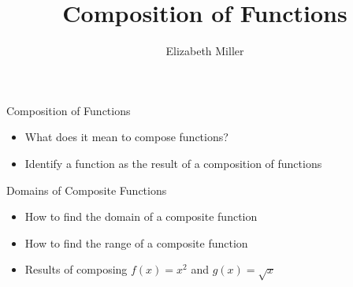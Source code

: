 \documentclass{ximera}
\author{Elizabeth Miller}
\title{Composition of Functions}
\begin{document}
\begin{abstract}
\end{abstract}
\maketitle


\begin{objectives}

\item Composition of Functions
\begin{itemize}
	\item What does it mean to compose functions?
	\item Identify a function as the result of a composition of functions
\end{itemize}

\item Domains of Composite Functions
\begin{itemize}
	\item How to find the domain of a composite function
	\item How to find the range of a composite function
	\item Results of composing $f(x)=x^2$ and $g(x)=\sqrt{x}$
\end{itemize}



\end{objectives}
\end{document}
